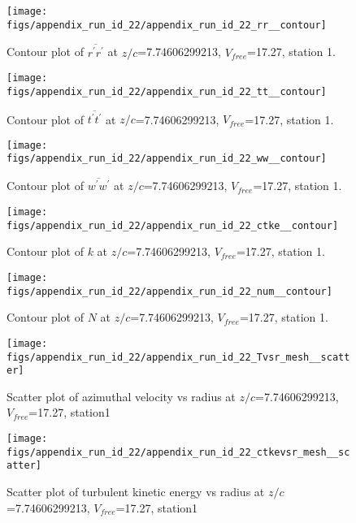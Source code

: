 \begin{figure}[H]
\centering
\texttt{[image: figs/appendix\_run\_id\_22/appendix\_run\_id\_22\_rr\_\_contour]}
\caption{Contour plot of $\overline{r^\prime r^\prime}$ at $z/c$=7.74606299213, $V_{free}$=17.27, station 1.}
\label{fig:appendix_run_id_22_rr__contour}
\end{figure}


\begin{figure}[H]
\centering
\texttt{[image: figs/appendix\_run\_id\_22/appendix\_run\_id\_22\_tt\_\_contour]}
\caption{Contour plot of $\overline{t^\prime t^\prime}$ at $z/c$=7.74606299213, $V_{free}$=17.27, station 1.}
\label{fig:appendix_run_id_22_tt__contour}
\end{figure}


\begin{figure}[H]
\centering
\texttt{[image: figs/appendix\_run\_id\_22/appendix\_run\_id\_22\_ww\_\_contour]}
\caption{Contour plot of $\overline{w^\prime w^\prime}$ at $z/c$=7.74606299213, $V_{free}$=17.27, station 1.}
\label{fig:appendix_run_id_22_ww__contour}
\end{figure}


\begin{figure}[H]
\centering
\texttt{[image: figs/appendix\_run\_id\_22/appendix\_run\_id\_22\_ctke\_\_contour]}
\caption{Contour plot of $k$ at $z/c$=7.74606299213, $V_{free}$=17.27, station 1.}
\label{fig:appendix_run_id_22_ctke__contour}
\end{figure}


\begin{figure}[H]
\centering
\texttt{[image: figs/appendix\_run\_id\_22/appendix\_run\_id\_22\_num\_\_contour]}
\caption{Contour plot of $N$ at $z/c$=7.74606299213, $V_{free}$=17.27, station 1.}
\label{fig:appendix_run_id_22_num__contour}
\end{figure}


\begin{figure}[H]
\centering
\texttt{[image: figs/appendix\_run\_id\_22/appendix\_run\_id\_22\_Tvsr\_mesh\_\_scatter]}
\caption{Scatter plot of azimuthal velocity vs radius at $z/c$=7.74606299213, $V_{free}$=17.27, station1}
\label{fig:appendix_run_id_22_Tvsr_mesh__scatter}
\end{figure}


\begin{figure}[H]
\centering
\texttt{[image: figs/appendix\_run\_id\_22/appendix\_run\_id\_22\_ctkevsr\_mesh\_\_scatter]}
\caption{Scatter plot of turbulent kinetic energy vs radius at $z/c$=7.74606299213, $V_{free}$=17.27, station1}
\label{fig:appendix_run_id_22_ctkevsr_mesh__scatter}
\end{figure}


